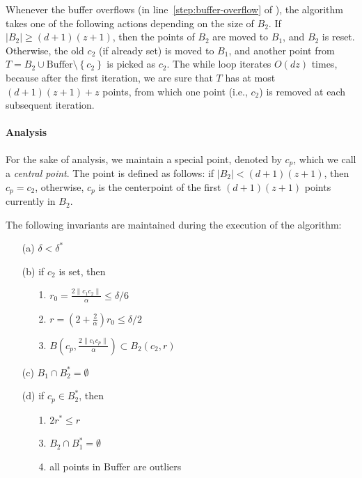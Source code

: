 \documentclass[envcountsame]{cls/cccg15}
\newcommand{\cp}{c_p}
\newcommand{\dz}{(d + 1)(z + 1)}
\newcommand{\Buffer}{\ensuremath{\text{Buffer}}}
\newcommand{\set}[1]{\left\{ #1 \right\}}
\newcommand{\card}[1]{\left|{#1}\right|}
\newcommand{\len}[1]{\|{#1}\|}
\newcommand{\lee}{\leqslant}
\newcommand{\gee}{\geqslant}
\renewcommand{\leq}{\lee}
\renewcommand{\le}{\lee}
\renewcommand{\ge}{\gee}
\begin{document}
Whenever the buffer overflows (in line~\ref{step:buffer-overflow} of ),
the algorithm takes one of the following actions
depending on the size of $B_2$. 
If $|B_2| \ge \dz$, then the points of $B_2$ are moved to $B_1$, and $B_2$ is reset.
Otherwise, the old $c_2$ (if already set) is moved to $B_1$,
and another point from $T = B_2 \cup \Buffer \setminus \set{c_2}$ is picked as $c_2$.
The while loop iterates $O(dz)$ times,
because after the first iteration, we are sure 
that $T$ has at most $\dz + z$ points, from which 
one point (i.e., $c_2$) is removed at each subsequent iteration.


\paragraph{Analysis}
For the sake of analysis, we maintain a special point,
denoted by $\cp$, %
which we call a \emph{central point}.
The point is defined as follows:
if $\card{B_2} < \dz$, then $\cp = c_2$, otherwise,
$\cp$ is the centerpoint of the first $\dz$ points currently in $B_2$.

\begin{lemma}
\label{lem:invariants}
	The following invariants are maintained during the execution of the algorithm:

\begin{enumerate}
\item [(a)] $\delta < \delta^*$ %
\item [(b)] if $c_2$ is set, then
\begin{enumerate}
	\item[1.] $r_0 = \frac{2 \len{c_1 c_2}}{\alpha} \leq \delta/6$
	\item[2.] $r = (2 + \frac{2}{\alpha})r_0 \leq \delta/2$
	\item[3.] $B(c_p, \frac{2 \len{c_1 c_p}}{\alpha}) \subset B_2(c_2, r)$
\end{enumerate}
\item [(c)] $B_1 \cap B_2^* = \emptyset$
\item [(d)]  if $\cp \in B_2^*$, then 
	\begin{enumerate}
		\item [1.] $2r^* \le r$
		\item [3.] $B_2 \cap B_1^* = \emptyset$
		\item [4.] all points in $\Buffer$ are outliers
	\end{enumerate}

\end{enumerate}
\end{lemma}
\end{document}
